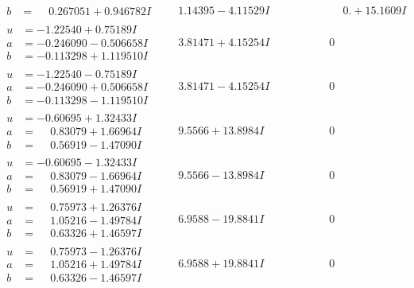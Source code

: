 \documentclass[1p]{elsarticle_modified}
\theoremstyle{definition}
\begin{document}
$$\begin{array}{c|c|c}
\begin{aligned}
b &= \phantom{-}0.267051 + 0.946782 I\end{aligned}
 & \phantom{-}1.14395 - 4.11529 I & \phantom{-0.000000 -}0. + 15.1609 I \\ \hline\begin{aligned}
u &= -1.22540 + 0.75189 I \\
a &= -0.246090 - 0.506658 I \\
b &= -0.113298 + 1.119510 I\end{aligned}
 & \phantom{-}3.81471 + 4.15254 I & \phantom{-0.000000 } 0 \\ \hline\begin{aligned}
u &= -1.22540 - 0.75189 I \\
a &= -0.246090 + 0.506658 I \\
b &= -0.113298 - 1.119510 I\end{aligned}
 & \phantom{-}3.81471 - 4.15254 I & \phantom{-0.000000 } 0 \\ \hline\begin{aligned}
u &= -0.60695 + 1.32433 I \\
a &= \phantom{-}0.83079 + 1.66964 I \\
b &= \phantom{-}0.56919 - 1.47090 I\end{aligned}
 & \phantom{-}9.5566 + 13.8984 I & \phantom{-0.000000 } 0 \\ \hline\begin{aligned}
u &= -0.60695 - 1.32433 I \\
a &= \phantom{-}0.83079 - 1.66964 I \\
b &= \phantom{-}0.56919 + 1.47090 I\end{aligned}
 & \phantom{-}9.5566 - 13.8984 I & \phantom{-0.000000 } 0 \\ \hline\begin{aligned}
u &= \phantom{-}0.75973 + 1.26376 I \\
a &= \phantom{-}1.05216 - 1.49784 I \\
b &= \phantom{-}0.63326 + 1.46597 I\end{aligned}
 & \phantom{-}6.9588 - 19.8841 I & \phantom{-0.000000 } 0 \\ \hline\begin{aligned}
u &= \phantom{-}0.75973 - 1.26376 I \\
a &= \phantom{-}1.05216 + 1.49784 I \\
b &= \phantom{-}0.63326 - 1.46597 I\end{aligned}
 & \phantom{-}6.9588 + 19.8841 I & \phantom{-0.000000 } 0 \\ \hline\begin{aligned}

\end{aligned}
\end{array}$$
\end{document}
